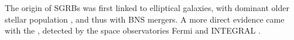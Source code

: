 %
%
The origin of \acp{SGRB} was first linked to elliptical galaxies, with dominant 
older stellar population 
\citep[\eg][]{Gehrels:2005qk,Fox:2005kv,Barthelmy:2005bx,Berger:2005dr,Panaitescu:2005er,Bloom:2005qx,Guetta:2005bb,Nakar:2007yr}, 
and thus with \ac{BNS} mergers. A more direct evidence came with the \GRB{}
\citep{Savchenko:2017ffs,Alexander:2017aly,Troja:2017nqp,Monitor:2017mdv,Nynka:2018vup,Hajela:2019mjy}, 
detected by the space observatories Fermi \citep{TheFermi-LAT:2015kwa} and INTEGRAL \citep{Winkler:2011}.
%
%

